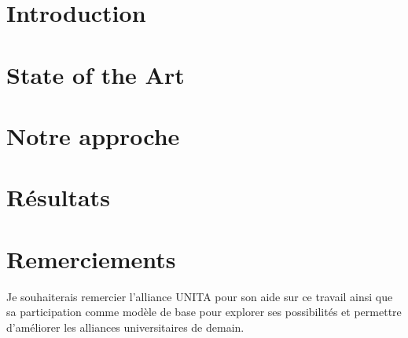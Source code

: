 \documentclass{cnriut} %
\begin{document}
\creationEnTete        %

\section{Introduction}


\section{State of the Art}


\section{Notre approche}


\section{Résultats}


\section{Remerciements}
Je souhaiterais remercier l'alliance UNITA pour son aide sur ce travail ainsi que sa participation comme modèle de base pour explorer ses possibilités et permettre d'améliorer les alliances universitaires de demain.

\printbibliography
\end{document}
